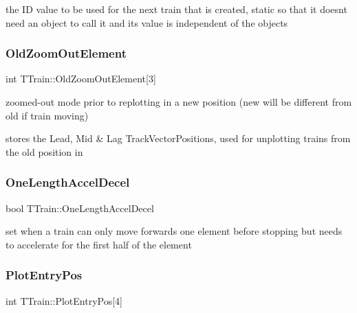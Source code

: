 the ID value to be used for the next train that is created, static so that it doesn\textquotesingle{}t need an object to call it and its value is independent of the objects \mbox{\label{class_t_train_a29c7350be73eb11a6c018a4bc8f8099a}} 
\subsubsection{\texorpdfstring{Old\+Zoom\+Out\+Element}{OldZoomOutElement}}
{\footnotesize\ttfamily int T\+Train\+::\+Old\+Zoom\+Out\+Element\mbox{[}3\mbox{]}\hspace{0.3cm}{\ttfamily [private]}}



zoomed-\/out mode prior to replotting in a new position (new will be different from old if train moving) 

stores the Lead, Mid \& Lag Track\+Vector\+Positions, used for unplotting trains from the old position in \mbox{\label{class_t_train_a36dc9bd48fb78d4257fe117908829dd7}} 
\subsubsection{\texorpdfstring{One\+Length\+Accel\+Decel}{OneLengthAccelDecel}}
{\footnotesize\ttfamily bool T\+Train\+::\+One\+Length\+Accel\+Decel\hspace{0.3cm}{\ttfamily [private]}}

set when a train can only move forwards one element before stopping but needs to accelerate for the first half of the element \mbox{\label{class_t_train_ac4ff3ae93a80d230d1ddcb992b0b546a}} 
\subsubsection{\texorpdfstring{Plot\+Entry\+Pos}{PlotEntryPos}}
{\footnotesize\ttfamily int T\+Train\+::\+Plot\+Entry\+Pos\mbox{[}4\mbox{]}\hspace{0.3cm}{\ttfamily [private]}}

